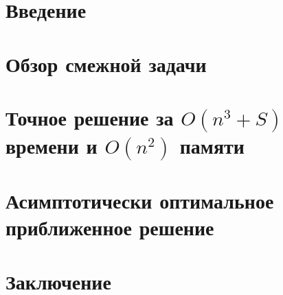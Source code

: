 \documentclass[14pt]{extarticle}
\begin{document}
%	
	
	\setcounter{page}{2}
	\begin{abstract}
		
	\end{abstract}
	\newpage
	
	\tableofcontents
	\newpage
	
	\section{Введение}
	
    \newpage
    
    \section{Обзор смежной задачи}
    
    \newpage
    
    \section{Точное решение за $O(n^3+S)$ времени и $O(n^2)$ памяти}
    
    \newpage
    
    \section{Асимптотически оптимальное приближенное решение}
    
    \newpage

	\section{Заключение}
	
	\newpage
	
	
\end{document}

